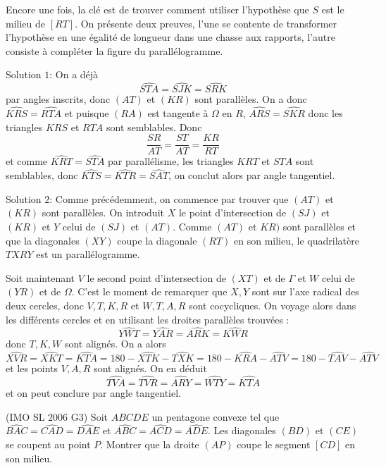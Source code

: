 \begin{sol}
Encore une fois, la clé est de trouver comment utiliser l'hypothèse que $S$ est le milieu de $[RT]$. On présente deux preuves, l'une se contente de transformer l'hypothèse en une égalité de longueur dans une chasse aux rapports, l'autre consiste à compléter la figure du parallélogramme.

Solution $1$: On a déjà
$$\widehat{STA}=\widehat{SJK}=\widehat{SRK}$$ par angles inscrits, donc $(AT)$ et $(KR)$ sont parallèles.
On a donc $\widehat{KRS}=\widehat{RTA}$ et puisque $(RA)$ est tangente à $\Omega$ en $R$, $\widehat{ARS}=\widehat{SKR}$ donc les triangles $KRS$ et $RTA$ sont semblables.
Donc $$\frac{SR}{AT}=\frac{ST}{AT}=\frac{KR}{RT}$$ et comme $\widehat{KRT}=\widehat{STA}$ par parallélisme, les triangles $KRT$ et $STA$ sont semblables, donc $\widehat{KTS}=\widehat{KTR}=\widehat{SAT}$, on conclut alors par angle tangentiel.


Solution $2$: Comme précédemment, on commence par trouver que $(AT)$ et $(KR)$ sont parallèles. On introduit $X$ le point d'intersection de $(SJ)$ et $(KR)$ et $Y$ celui de $(SJ)$ et $(AT)$. Comme $(AT)$ et $KR)$ sont parallèles et que la diagonales $(XY)$ coupe la diagonale $(RT)$ en son milieu, le quadrilatère $TXRY$ est un parallélogramme.

Soit maintenant $V$ le second point d'intersection de $(XT)$ et de $\Gamma$ et $W$ celui de $(YR)$ et de $\Omega$. C'est le moment de remarquer que $X,Y$ sont sur l'axe radical des deux cercles, donc $V,T,K,R$ et $W,T,A,R$ sont cocycliques. On voyage alors dans les différents cercles et en utilisant les droites parallèles trouvées :
$$\widehat{YWT}=\widehat{YAR}=\widehat{ARK}=\widehat{KWR}$$
donc $T,K,W$ sont alignés. On a alors
\[\widehat{XVR}=\widehat{XKT}=\widehat{KTA}=180-\widehat{XTK}-\widehat{TXK}=180-\widehat{KRA}-\widehat{ATV}=180-\widehat{TAV}-\widehat{ATV}\]
et les points $V,A,R$ sont alignés.
On en déduit
$$\widehat{TVA}=\widehat{TVR}=\widehat{ARY}=\widehat{WTY}=\widehat{KTA}$$ et on peut conclure par angle tangentiel.
\end{sol}


\begin{exo}
(IMO SL $2006$ G$3$)
Soit $ABCDE$ un pentagone convexe tel que
$\widehat{BAC}=\widehat{CAD}=\widehat{DAE}$ et $\widehat{ABC}=\widehat{ACD}=\widehat{ADE}$.
Les diagonales $(BD)$ et $(CE)$ se coupent au point $P$. Montrer que la droite $(AP)$ coupe le segment $[CD]$ en son milieu.
\end{exo}


